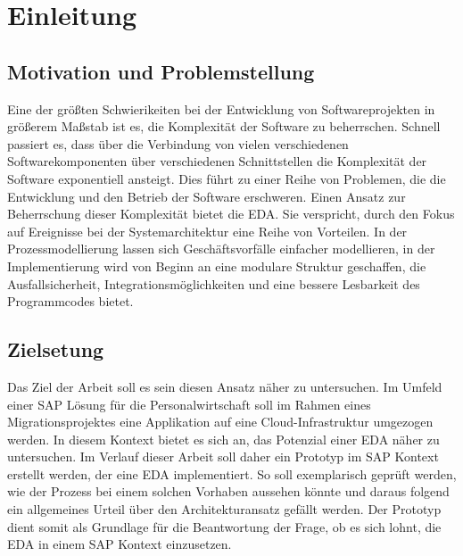 \section{Einleitung}


\subsection{Motivation und Problemstellung}
Eine der größten Schwierikeiten bei der Entwicklung von Softwareprojekten in größerem Maßstab ist es, die Komplexität der Software zu beherrschen. Schnell passiert es, dass über die Verbindung von vielen verschiedenen Softwarekomponenten über verschiedenen Schnittstellen die Komplexität der Software exponentiell ansteigt. Dies führt zu einer Reihe von Problemen, die die Entwicklung und den Betrieb der Software erschweren. \citepls Einen Ansatz zur Beherrschung dieser Komplexität bietet die \ac{EDA}. Sie verspricht, durch den Fokus auf Ereignisse bei der Systemarchitektur eine Reihe von Vorteilen. In der Prozessmodellierung lassen sich Geschäftsvorfälle einfacher modellieren, in der Implementierung wird von Beginn an eine modulare Struktur geschaffen, die Ausfallsicherheit, Integrationsmöglichkeiten und eine bessere Lesbarkeit des Programmcodes bietet.\citepls 

\subsection{Zielsetung}
Das Ziel der Arbeit soll es sein diesen Ansatz näher zu untersuchen. Im Umfeld einer SAP Lösung für die Personalwirtschaft soll im Rahmen eines Migrationsprojektes eine Applikation auf eine Cloud-Infrastruktur umgezogen werden. In diesem Kontext bietet es sich an, das Potenzial einer \ac{EDA} näher zu untersuchen. Im Verlauf dieser Arbeit soll daher ein Prototyp im SAP Kontext erstellt werden, der eine \ac{EDA} implementiert. So soll exemplarisch geprüft werden, wie der Prozess bei einem solchen Vorhaben aussehen könnte und daraus folgend ein allgemeines Urteil über den Architekturansatz gefällt werden. Der Prototyp dient somit als Grundlage für die Beantwortung der Frage, ob es sich lohnt, die \ac{EDA} in einem SAP Kontext einzusetzen.

